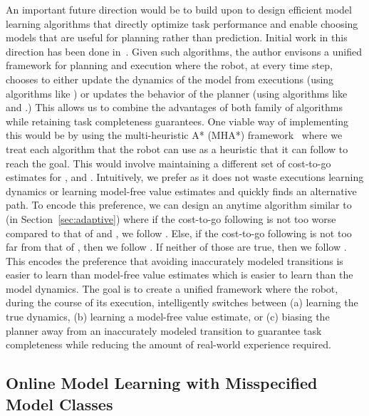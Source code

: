 An important future direction would be to build upon \taml{} to design
efficient model learning algorithms that directly optimize task
performance and enable choosing models that are useful for planning
rather than prediction. Initial work in this direction has been done
in~\cite{grimm2020value, DBLP:journals/corr/abs-2106-10316,
  DBLP:conf/icml/AyoubJSWY20, DBLP:journals/corr/abs-2106-14080,
  DBLP:journals/corr/abs-2106-03273,
  DBLP:journals/corr/abs-2110-02758}.
Given such algorithms, the author envisons a
unified framework for planning and execution where the robot, at every
time step, chooses to either update the dynamics of the model from
executions (using algorithms like \taml{}) or updates the behavior of
the planner (using algorithms like \cmax{} and \cmaxpp{}.) This allows
us to combine the advantages of both family of algorithms while
retaining task completeness guarantees. One viable way of implementing
this would be by using the multi-heuristic A* (MHA*)
framework~\cite{DBLP:journals/ijrr/AineSNHL16} where we treat each
algorithm that the robot can use as a heuristic that it can follow to
reach the goal. This would involve maintaining a different set of
cost-to-go estimates for \taml{}, \cmax{} and \cmaxpp{}. Intuitively,
we prefer \cmax{} as it does not waste executions learning dynamics or
learning model-free value estimates and quickly finds an alternative
path. To encode this preference, we can design an anytime algorithm
similar to \acmaxpp{} (in Section~\ref{sec:adaptive}) where if the
cost-to-go following \cmax{} is not too worse compared to that of
\taml{} and \cmaxpp{}, we follow \cmax{}. Else, if the cost-to-go
following \cmaxpp{} is not too far from that of \taml{}, then we
follow \cmaxpp{}. If neither of those are true, then we follow
\taml{}. This encodes the preference that avoiding inaccurately
modeled transitions is easier to learn than model-free value
estimates which is easier to learn than the model dynamics. The goal is to create a unified
framework where the robot, during the course of its execution,
intelligently switches between (a) learning the true dynamics, (b)
learning a model-free value estimate, or (c)
biasing the planner away from an inaccurately modeled
transition to guarantee task completeness while reducing
the amount of real-world experience required.


\subsection{Online Model Learning with Misspecified Model Classes}
\label{sec:online-model-learn}

